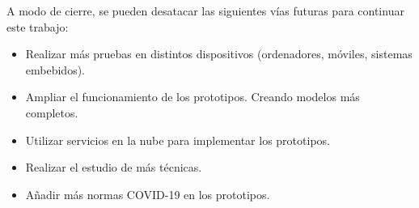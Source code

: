 A modo de cierre, se pueden desatacar las siguientes vías futuras para continuar este trabajo:
\begin{itemize}
	\item Realizar más pruebas en distintos dispositivos (ordenadores, móviles, sistemas embebidos).
	\item Ampliar el funcionamiento de los prototipos. Creando modelos más completos.
	\item Utilizar servicios en la nube para implementar los prototipos.
	\item Realizar el estudio de más técnicas.
	\item Añadir más normas COVID-19 en los prototipos.
\end{itemize}